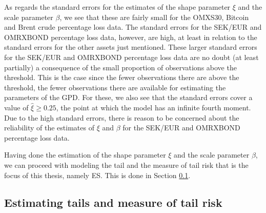 \documentclass[a4paper,11pt]{article}
\theoremstyle{definition}
\theoremstyle{definition}
\theoremstyle{definition}
\theoremstyle{definition}
\theoremstyle{remark}
\begin{document}
As regards the standard errors for the estimates of the shape parameter \(\xi\) and the scale parameter \(\beta\), we see that these are fairly small for the OMXS30, Bitcoin and Brent crude percentage loss data. The standard errors for the SEK/EUR and OMRXBOND percentage loss data, however, are high, at least in relation to the standard errors for the other assets just mentioned. These larger standard errors for the SEK/EUR and OMRXBOND percentage loss data are no doubt (at least partially) a consequence of the small proportion of observations above the threshold. This is the case since the fewer observations there are above the threshold, the fewer observations there are available for estimating the parameters of the GPD. For these, we also see that the standard errors cover a value of \(\hat \xi \geq 0.25\), the point at which the model has an infinite fourth moment. Due to the high standard errors, there is reason to be concerned about the reliability of the estimates of \(\xi\) and \(\beta\) for the SEK/EUR and OMRXBOND percentage loss data.

Having done the estimation of the shape parameter \(\xi\) and the scale parameter \(\beta\), we can proceed with modeling the tail and the measure of tail risk that is the focus of this thesis, namely ES. This is done in Section \ref{sec:tailmodeling}.

\hypertarget{sec:tailmodeling}{%
\subsection{Estimating tails and measure of tail risk}\label{sec:tailmodeling}}
\end{document}
